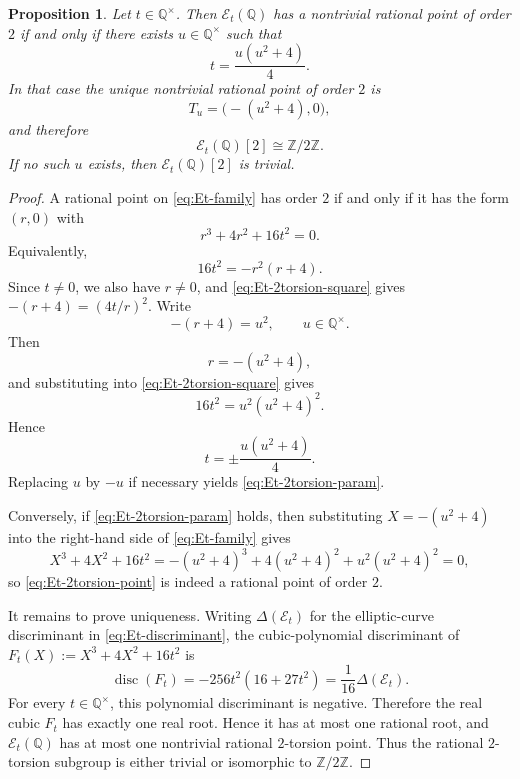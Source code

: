 \documentclass[10pt,a4paper]{amsart}
\newtheorem{proposition}{Proposition}
\newcommand{\Q}{\mathbb{Q}}
\newcommand{\Z}{\mathbb{Z}}
\newcommand{\mathcalE}{\mathcal{E}}
\begin{document}
\begin{proposition}\label{prop:Et-2torsion}
Let $t\in\Q^\times$. Then $\mathcalE_t(\Q)$ has a nontrivial rational point of order $2$ if and only if there exists $u\in\Q^\times$ such that
\begin{equation}\label{eq:Et-2torsion-param}
t=\frac{u(u^2+4)}{4}.
\end{equation}
In that case the unique nontrivial rational point of order $2$ is
\begin{equation}\label{eq:Et-2torsion-point}
T_u=\bigl(-(u^2+4),0\bigr),
\end{equation}
and therefore
\[
\mathcalE_t(\Q)[2]\cong \Z/2\Z.
\]
If no such $u$ exists, then $\mathcalE_t(\Q)[2]$ is trivial.
\end{proposition}

\begin{proof}
A rational point on \eqref{eq:Et-family} has order $2$ if and only if it has the form $(r,0)$ with
\begin{equation}\label{eq:Et-2torsion-cubic}
r^3+4r^2+16t^2=0.
\end{equation}
Equivalently,
\begin{equation}\label{eq:Et-2torsion-square}
16t^2=-r^2(r+4).
\end{equation}
Since $t\neq 0$, we also have $r\neq 0$, and \eqref{eq:Et-2torsion-square} gives $-(r+4)=(4t/r)^2$. Write
\[
-(r+4)=u^2,\qquad u\in\Q^\times.
\]
Then
\[
r=-(u^2+4),
\]
and substituting into \eqref{eq:Et-2torsion-square} gives
\[
16t^2=u^2(u^2+4)^2.
\]
Hence
\[
t=\pm \frac{u(u^2+4)}{4}.
\]
Replacing $u$ by $-u$ if necessary yields \eqref{eq:Et-2torsion-param}.

Conversely, if \eqref{eq:Et-2torsion-param} holds, then substituting $X=-(u^2+4)$ into the right-hand side of \eqref{eq:Et-family} gives
\[
X^3+4X^2+16t^2=-(u^2+4)^3+4(u^2+4)^2+u^2(u^2+4)^2=0,
\]
so \eqref{eq:Et-2torsion-point} is indeed a rational point of order $2$.

It remains to prove uniqueness. Writing $\Delta(\mathcalE_t)$ for the
elliptic-curve discriminant in \eqref{eq:Et-discriminant}, the
cubic-polynomial discriminant of $F_t(X):=X^3+4X^2+16t^2$ is
\[
\operatorname{disc}(F_t)=-256t^2(16+27t^2)
=\frac{1}{16}\Delta(\mathcalE_t).
\]
For every $t\in\Q^\times$, this polynomial discriminant is negative.
Therefore the real cubic \(F_t\) has exactly one real root. Hence it has at
most one rational root, and
$\mathcalE_t(\Q)$ has at most one nontrivial rational $2$-torsion point. Thus
the rational $2$-torsion subgroup is either trivial or isomorphic to
$\Z/2\Z$.
\end{proof}
\end{document}
